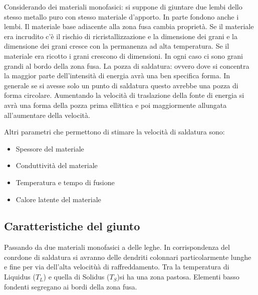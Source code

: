 Considerando dei materiali monofasici: si suppone di giuntare due lembi dello stesso metallo puro con stesso materiale d'apporto.
In parte fondono anche i lembi.
Il materiale base adiacente alla zona fusa cambia proprietà.
Se il materiale era incrudito c'è il rischio di ricristallizzazione e la dimensione dei grani e la dimensione dei grani cresce con la permanenza ad alta temperatura.
Se il materiale era ricotto i grani crescono di dimensioni.
In ogni caso ci sono grani grandi al bordo della zona fusa.
La pozza di saldatura: ovvero dove si concentra la maggior parte dell'intensità di energia avrà una ben specifica forma.
In generale se si avesse solo un punto di saldatura questo avrebbe una pozza di forma circolare.
Aumentando la velocità di traslazione della fonte di energia si avrà una forma della pozza prima ellittica e poi maggiormente allungata all'aumentare della velocità.

Altri parametri che permettono di stimare la velocità di saldatura sono:
\begin{itemize}
\item Spessore del materiale
\item Conduttività del materiale
\item Temperatura e tempo di fusione
\item Calore latente del materiale
\end{itemize}

\subsection{Caratteristiche del giunto}
Passando da due materiali monofasici a delle leghe.
In corrispondenza del conrdone di saldatura si avranno delle dendriti colonnari particolarmente lunghe e fine per via dell'alta velocitùà di raffreddamento.
Tra la temperatura di Liquidus ($T_L$) e quella di Solidus ($T_S$)si ha una zona pastosa.
Elementi basso fondenti segregano ai bordi della zona fusa.

